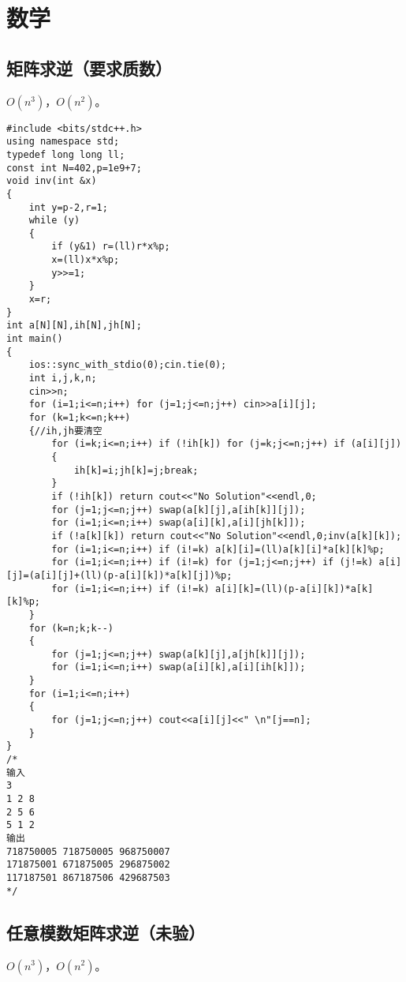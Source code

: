 \documentclass{ctexart}
\begin{document}
\newpage

\section{数学}

\subsection{矩阵求逆（要求质数）}

$O(n^3)$，$O(n^2)$。

\begin{lstlisting}
#include <bits/stdc++.h>
using namespace std;
typedef long long ll;
const int N=402,p=1e9+7;
void inv(int &x)
{
	int y=p-2,r=1;
	while (y)
	{
		if (y&1) r=(ll)r*x%p;
		x=(ll)x*x%p;
		y>>=1;
	}
	x=r;
}
int a[N][N],ih[N],jh[N];
int main()
{
	ios::sync_with_stdio(0);cin.tie(0);
	int i,j,k,n;
	cin>>n;
	for (i=1;i<=n;i++) for (j=1;j<=n;j++) cin>>a[i][j];
	for (k=1;k<=n;k++)
	{//ih,jh要清空
		for (i=k;i<=n;i++) if (!ih[k]) for (j=k;j<=n;j++) if (a[i][j])
		{
			ih[k]=i;jh[k]=j;break;
		}
		if (!ih[k]) return cout<<"No Solution"<<endl,0;
		for (j=1;j<=n;j++) swap(a[k][j],a[ih[k]][j]);
		for (i=1;i<=n;i++) swap(a[i][k],a[i][jh[k]]);
		if (!a[k][k]) return cout<<"No Solution"<<endl,0;inv(a[k][k]);
		for (i=1;i<=n;i++) if (i!=k) a[k][i]=(ll)a[k][i]*a[k][k]%p;
		for (i=1;i<=n;i++) if (i!=k) for (j=1;j<=n;j++) if (j!=k) a[i][j]=(a[i][j]+(ll)(p-a[i][k])*a[k][j])%p;
		for (i=1;i<=n;i++) if (i!=k) a[i][k]=(ll)(p-a[i][k])*a[k][k]%p;	
	}
	for (k=n;k;k--)
	{
		for (j=1;j<=n;j++) swap(a[k][j],a[jh[k]][j]);
		for (i=1;i<=n;i++) swap(a[i][k],a[i][ih[k]]);
	}
	for (i=1;i<=n;i++)
	{
		for (j=1;j<=n;j++) cout<<a[i][j]<<" \n"[j==n];
	}
}
/*
输入
3
1 2 8
2 5 6
5 1 2
输出
718750005 718750005 968750007
171875001 671875005 296875002
117187501 867187506 429687503
*/
\end{lstlisting}

\subsection{任意模数矩阵求逆（未验）}

$O(n^3)$，$O(n^2)$。
\end{document}
